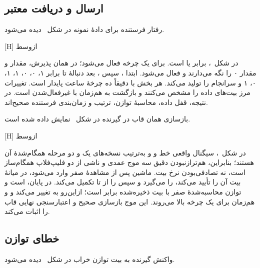 \subsection{ارسال و دریافت معتبر}

رفتار فرستنده برای دادهٔ نمونه در شکل~ دیده می‌شود.

[H]
‌ازوسط

در شکل~،  برابر  یا
 است.  برای یک چرخه فعال می‌شود؛ در همان پذیرش،
 مقدار  و  مقدار ۰ را نگه می‌دارند و
 فعال می‌شود.  ابتدا ، سپس ، بعد دنبالهٔ
 تا  برابر ۱، ۰، ۰، ۱، ۱، ۰، ۱ و سرانجام  را تولید
می‌کند. هر بخش با  دقیقاً ده چرخهٔ ساعت پایدار است. تغییرات
 مرز بیت‌های داده را مشخص می‌کنند و بازگشت  به 
هم‌زمان با غیرفعال‌شدن  است. در نتیجه، قفل داده، محاسبهٔ توازن، ترتیب
 و زمان‌بندی فرستنده صحیح‌اند.

بازسازی همان قاب در گیرنده در شکل~ نمایش داده شده است.

[H]
‌ازوسط

در شکل~،  سیگنال واقعی خط و  و
 به‌ترتیب نسخه‌های یک و دو مرحله همگام‌شدهٔ آن هستند؛ بنابراین،
هم‌ترازنبودن دقیق سه موج عمدی و ناشی از دو فلیپ‌فلاپ همگام‌ساز است، نه تصادفی‌بودن نرخ
بیت. ماشین پس از مشاهدهٔ صفر وارد  می‌شود، در میانهٔ بیت آن را تأیید می‌کند،
 را می‌گیرد و سپس  را از  تا 
تکمیل می‌کند. در پایان،  است و توازن محاسبه‌شدهٔ صفر با بیت ذخیره‌شده برابر
است؛ ازاین‌رو  به  تغییر می‌کند و  و
 هم‌زمان برای یک چرخه بالا می‌روند. این موج بازسازی صحیح و
اعتبارسنجی نهایی قاب را اثبات می‌کند.


\subsection{خطای توازن}

واکنش گیرنده به بیت توازن خراب در شکل~ دیده می‌شود.

